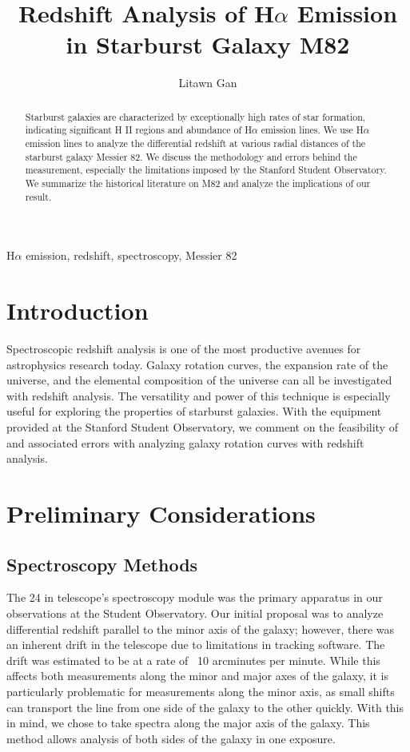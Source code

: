 \documentclass[useAMS,usenatbib]{mn2e}
\title[Redshift Analysis]{Redshift Analysis of H$\alpha$ Emission in Starburst Galaxy M82}
\author[L. Gan]{Litawn Gan}
\begin{document}
\pagerange{\pageref{firstpage}--\pageref{lastpage}} 

\maketitle

\label{firstpage}

\Large
\begin{abstract}
\Large
Starburst galaxies are characterized by exceptionally high rates of star formation, indicating significant H II regions and abundance of H$\alpha$ emission lines. We use H$\alpha$ emission lines to analyze the differential redshift at various radial distances of the starburst galaxy Messier 82. We discuss the methodology and errors behind the measurement, especially the limitations imposed by the Stanford Student Observatory. We summarize the historical literature on M82 and analyze the implications of our result.
\end{abstract}
\Large
\begin{keywords}
\Large
H$\alpha$ emission, redshift, spectroscopy, Messier 82
\end{keywords}


\clearpage
\renewcommand{\baselinestretch}{2}
\normalsize
\setlength{\parindent}{0ex}
\section*{Introduction}

Spectroscopic redshift analysis is one of the most productive avenues for astrophysics research today. Galaxy rotation curves, the expansion rate of the universe, and the elemental composition of the universe can all be investigated with redshift analysis. The versatility and power of this technique is especially useful for exploring the properties of starburst galaxies. With the equipment provided at the Stanford Student Observatory, we comment on the feasibility of and associated errors with analyzing galaxy rotation curves with redshift analysis.

\section*{Preliminary Considerations}
\subsection*{Spectroscopy Methods}
The 24 in telescope's spectroscopy module was the primary apparatus in our observations at the Student Observatory. Our initial proposal was to analyze differential redshift parallel to the minor axis of the galaxy; however, there was an inherent drift in the telescope due to limitations in tracking software. The drift was estimated to be at a rate of ~10 arcminutes per minute. While this affects both measurements along the minor and major axes of the galaxy, it is particularly problematic for measurements along the minor axis, as small shifts can transport the line from one side of the galaxy to the other quickly. With this in mind, we chose to take spectra along the major axis of the galaxy. This method allows analysis of both sides of the galaxy in one exposure.
\end{document}
